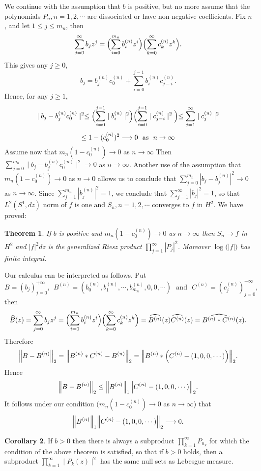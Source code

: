 \documentclass{amsart}
\newtheorem{Th}{Theorem}[section]
\theoremstyle{definition}
\newtheorem{Cor}[Th]{Corollary}
\theoremstyle{remark}
\numberwithin{equation}{section}
\newcommand{\1}{\mathbb{1}}
\begin{document}
  We continue with the assumption that $b$ is positive, but no more assume that the polynomials $P_n, n=1,2,\cdots$ are dissociated or have non-negative coefficients. Fix $n$, and let $1 \leq j \leq m_n$, then
  $$\sum_{j=0}^\infty b_jz^j = \Bigl(\sum_{i=0}^{m_n}b_i^{(n)}z^i\Bigr) \Bigl(\sum_{k=0}^\infty c_k^{(n)}z^k\Bigr).$$
 This gives any $j \geq 0$,
$$ b_j = b_j^{(n)}c_0^{(n)} + \sum_{i=0}^{j-1}b_i^{(n)}c_{j-i}^{(n)}.$$
Hence, for any $j \geq 1$,
$$\mid b_j - b_j^{(n)}c_0^{(n)}\mid^2 \leq \Bigl(\sum_{i=0}^{j-1}\mid b_i^{(n)}\mid^2\Bigr)\Bigl(\sum_{i=0}^{j-1}\mid c^{(n)}_{j-i}\mid^2\Bigl)\leq \sum_{j=1}^\infty \mid c^{(n)}_j\mid^2 $$
  $$\leq 1 - (c_0^{(n)})^2  \longrightarrow 0 ~~{\rm{as}} ~~ n\rightarrow \infty$$
  Assume now that $m_n(1-c_0^{(n)}) \longrightarrow 0$ as $n\rightarrow \infty$
  Then $\sum_{j=0}^{m_n}\mid b_j - b_j^{(n)}c_0^{(n)}\mid^2  \rightarrow 0$ as $n\rightarrow \infty.$
Another use of the assumption that $m_n(1-c_0^{(n)}) \longrightarrow 0$ as $n\rightarrow 0$ allows us to conclude that
$\sum_{j=0}^{m_n}| b_j - b_j^{(n)}|^2 \longrightarrow 0$ as $n\rightarrow \infty$. Since $\sum_{j=1}^{m_n}| b_j^{(n)}|^2 =1$, we conclude that $\sum_{j=1}^\infty | b_j|^2 = 1$, so that $L^2(S^1,dz)$ norm of $f$ is one and $S_n, n=1,2,\cdots$ converges to $f$ in $H^2$. We have proved:
\begin{Th}\label{th3}
If $b$ is positive and $m_n(1 -c_0^{(n)}) \longrightarrow 0$ as $n\rightarrow \infty$ then
$S_n \rightarrow f$ in $H^2$ and $|f|^2dz$ is the generalized Riesz product $\prod_{j=1}^\infty|P_j|^2$.
Moreover $\log \big(|f|\big)$ has finite integral.
\end{Th}
Our calculus can be interpreted as follows. Put $$B=(b_j)_{j=0}^{+\infty},~~ B^{(n)}=(b_0^{(n)},b_1^{(n)},\cdots,b_{m_n}^{(n)},0,0,\cdots ) {\textrm{~~and~~}}
 C^{(n)}=(c_j^{(n)})_{j=0}^{+\infty},$$
then
  $$\widehat{B}(z)=\sum_{j=0}^\infty b_jz^j = \Bigl(\sum_{i=0}^{m_n}b_i^{(n)}z^i\Bigr)\Bigl(\sum_{k=0}^\infty c_k^{(n)}z^k\Bigr)=
  \widehat{B^{(n)}}(z)\widehat{C^{(n)}}(z)=\widehat{{B^{(n)}*C^{(n)}}}(z).$$
Therefore
$$\Bigl\|B-B^{(n)}\Bigr\|_2=\Bigl\|{B^{(n)}*C^{(n)}}-B^{(n)}\Bigr\|_2=
\Bigl\|B^{(n)}*\Bigl(C^{(n)}-(1,0,0,\cdots)\Bigr)\Bigr\|_2.$$
Hence
$$\Bigl\|B-B^{(n)}\Bigr\|_2 \leq \Bigl\|B^{(n)}\Bigr\|_1
\Bigl\|C^{(n)}-(1,0,0,\cdots)\Bigr\|_2.$$
It follows under our condition $(m_n(1 -c_0^{(n)}) \longrightarrow 0$ as $n\rightarrow \infty$) that
$$\Bigl\|B^{(n)}\Bigr\|_1
\Bigl\|C^{(n)}-(1,0,0,\cdots)\Bigr\|_2 \longrightarrow 0.$$
\begin{Cor}\label{cor1}
If $b > 0$ then there is always a subproduct  $\prod_{k=1}^\infty P_{n_k}$ for which the condition of the above theorem is satisfied, so that if $b > 0$ holds, then a subproduct $\prod_{k=1}^\infty \mid P_k(z)\mid^2 $ has the same null sets as Lebesgue measure.
\end{Cor}
\end{document}
